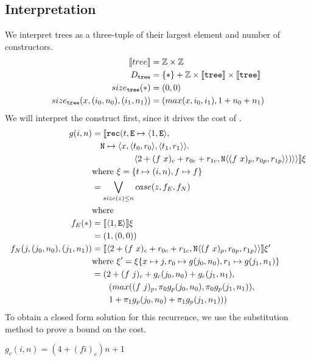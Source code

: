 \subsection{Interpretation}
%
We interpret trees as a three-tuple of their largest element and number of
 constructors.
%
\begin{align*}
  \llbracket tree \rrbracket &= \mathbb{Z} \times \mathbb{Z} \\
  D_{\texttt{tree}} &= \{\ast\} + \mathbb{Z} \times \llbracket \texttt{tree} \rrbracket \times \llbracket \texttt{tree} \rrbracket \\
  size_{\texttt{tree}}(\ast) &= (0, 0) \\
  size_{\texttt{tree}}(x, (i_0, n_0), (i_1, n_1)) &= (max(x, i_0, i_1), 1 + n_0 + n_1)
\end{align*}
%
We will interpret the  construct first, since it drives the cost of
.
%
\begin{align*}
  g(i,n) &= \LB\T{rec}(t, \T{E} \mapsto \LP 1,\T{E}\RP, \\
         &\quad \T{N} \mapsto \LP x,\LP t_0,r_0\RP,\LP t_1,r_1\RP\RP. \\
         &\quadfive \LP 2 + (f\ x)_c + r_{0c} + r_{1c}, \T{N}\LP (f\ x)_p,r_{0p},r_{1p}\RP\RP)\RP\RP\RB \xi\\
         &\text{where } \xi = \{t \mapsto (i,n), f \mapsto f \} \\
         &= \bigvee\limits_{size(z) \leq n} case(z, f_E, f_N) \\
         &\text{where} \\
  f_E(\ast) &= \LB \LP 1,\T{E}\RP\RB\xi  \\
            &= (1,(0,0)) \\
  f_N(j,(j_0, n_0),(j_1,n_1)) &= \LB \LP 2 + (f\ x)_c + r_{0c} + r_{1c}, \T{N}\LP (f\ x)_p,r_{0p},r_{1p}\RP\RP \RB \xi' \\
         &\text{where } \xi' = \xi \{ x \mapsto j, r_0 \mapsto g(j_0,n_0), r_1 \mapsto g(j_1,n_1) \} \\
         &= (2 + (f\ j)_c + g_c(j_0,n_0) + g_c(j_1,n_1), \\
         &\qquad (max((f\ j)_p, \pi_0g_p(j_0,n_0), \pi_0g_p(j_1,n_1)), \\
         &\qquad 1 + \pi_1g_p(j_0,n_0) + \pi_1g_p(j_1,n_1)))
\end{align*}
%
To obtain a closed form solution for this recurrence, we use the substitution
method to prove a bound on the cost.
%
\begin{lemma}
  $g_c(i,n) = (4 + (f i)_c)n + 1$
\end{lemma}
%
